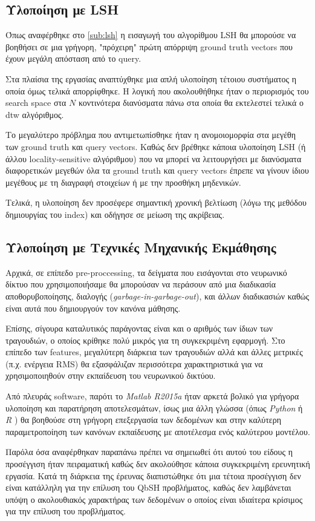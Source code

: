 \subsection{Υλοποίηση με LSH}
Όπως αναφέρθηκε στο \ref{sub:lsh} η εισαγωγή του αλγορίθμου LSH θα μπορούσε να βοηθήσει σε μια γρήγορη, "πρόχειρη" πρώτη απόρριψη ground truth vectors που έχουν μεγάλη απόσταση από το query.

Στα πλαίσια της εργασίας αναπτύχθηκε μια απλή υλοποίηση τέτοιου συστήματος η οποία όμως τελικά απορρίφθηκε.
Η λογική που ακολουθήθηκε ήταν ο περιορισμός του search space στα $N$ κοντινότερα διανύσματα πάνω στα οποία θα εκτελεστεί τελικά ο dtw αλγόριθμος.

Το μεγαλύτερο πρόβλημα που αντιμετωπίσθηκε ήταν η ανομοιομορφία στα μεγέθη των ground truth και query vectors.
Καθώς δεν βρέθηκε κάποια υλοποίηση LSH (ή άλλου locality-sensitive αλγόριθμου) που να μπορεί να λειτουργήσει με διανύσματα διαφορετικών μεγεθών όλα τα ground truth και query vectors έπρεπε να γίνουν ίδιου μεγέθους με τη διαγραφή στοιχείων ή με την προσθήκη μηδενικών.

Τελικά, η υλοποίηση δεν προσέφερε σημαντική χρονική βελτίωση (λόγω της μεθόδου δημιουργίας του index) και οδήγησε σε μείωση της ακρίβειας.

\subsection{Υλοποίηση με Τεχνικές Μηχανικής Εκμάθησης}
Αρχικά, σε επίπεδο pre-proccessing, τα δείγματα που εισάγονται στο νευρωνικό δίκτυο που χρησιμοποιήσαμε θα μπορούσαν να περάσουν από μια διαδικασία αποθορυβοποίησης, διαλογής (\textit{garbage-in-garbage-out}), και άλλων διαδικασιών καθώς είναι αυτά που δημιουργούν τον κανόνα μάθησης.

Επίσης, σίγουρα καταλυτικός παράγοντας είναι και ο αριθμός των ίδιων των τραγουδιών, ο οποίος κρίθηκε πολύ μικρός για τη συγκεκριμένη εφαρμογή.
Στο επίπεδο των features, μεγαλύτερη διάρκεια των τραγουδιών αλλά και άλλες μετρικές (π.χ. ενέργεια RMS) θα εξασφάλιζαν περισσότερα χαρακτηριστικά για να χρησιμοποιηθούν στην εκπαίδευση του νευρωνικού δικτύου.

Από πλευράς software, παρότι το \textit{Matlab R2015a} \cite{matlab} ήταν αρκετά βολικό για γρήγορα υλοποίηση και παρατήρηση αποτελεσμάτων, ίσως μια άλλη γλώσσα (όπως \textit{Python} \cite{python} ή \textit{R} \cite{r_lang}) θα βοηθούσε στη γρήγορη επεξεργασία των δεδομένων και στην καλύτερη παραμετροποίηση των κανόνων εκπαίδευσης με αποτέλεσμα ενός καλύτερου μοντέλου.

Παρόλα όσα αναφέρθηκαν παραπάνω πρέπει να σημειωθεί ότι αυτού του είδους η προσέγγιση ήταν πειραματική καθώς δεν ακολούθησε κάποια συγκεκριμένη ερευνητική εργασία.
Κατά τη διάρκεια της έρευνας διαπιστώθηκε ότι μια τέτοια προσέγγιση δεν είναι κατάλληλη για την επίλυση του
QbSH προβλήματος, καθώς δεν λαμβάνεται υπόψη ο ακολουθιακός χαρακτήρας των δεδομένων ο οποίος είναι ιδιαίτερα
κρίσιμος για την επίλυση του προβλήματος.
